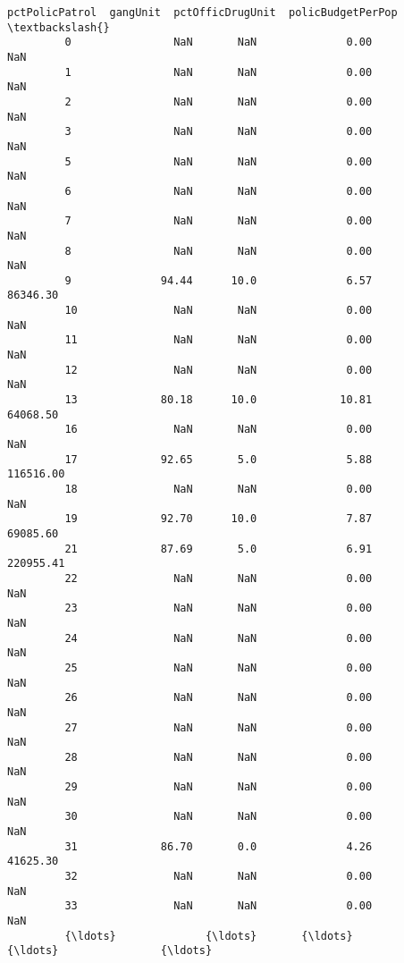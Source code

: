 \documentclass[11pt]{llncs}
\begin{document}
\begin{Verbatim}[commandchars=\\\{\}]
               pctPolicPatrol  gangUnit  pctOfficDrugUnit  policBudgetPerPop  \textbackslash{}
         0                NaN       NaN              0.00                NaN   
         1                NaN       NaN              0.00                NaN   
         2                NaN       NaN              0.00                NaN   
         3                NaN       NaN              0.00                NaN   
         5                NaN       NaN              0.00                NaN   
         6                NaN       NaN              0.00                NaN   
         7                NaN       NaN              0.00                NaN   
         8                NaN       NaN              0.00                NaN   
         9              94.44      10.0              6.57           86346.30   
         10               NaN       NaN              0.00                NaN   
         11               NaN       NaN              0.00                NaN   
         12               NaN       NaN              0.00                NaN   
         13             80.18      10.0             10.81           64068.50   
         16               NaN       NaN              0.00                NaN   
         17             92.65       5.0              5.88          116516.00   
         18               NaN       NaN              0.00                NaN   
         19             92.70      10.0              7.87           69085.60   
         21             87.69       5.0              6.91          220955.41   
         22               NaN       NaN              0.00                NaN   
         23               NaN       NaN              0.00                NaN   
         24               NaN       NaN              0.00                NaN   
         25               NaN       NaN              0.00                NaN   
         26               NaN       NaN              0.00                NaN   
         27               NaN       NaN              0.00                NaN   
         28               NaN       NaN              0.00                NaN   
         29               NaN       NaN              0.00                NaN   
         30               NaN       NaN              0.00                NaN   
         31             86.70       0.0              4.26           41625.30   
         32               NaN       NaN              0.00                NaN   
         33               NaN       NaN              0.00                NaN   
         {\ldots}              {\ldots}       {\ldots}               {\ldots}                {\ldots}   

\end{Verbatim}
\end{document}
